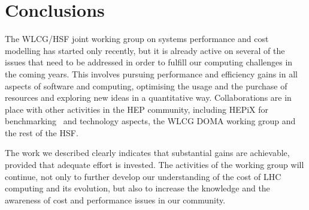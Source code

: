 \section{Conclusions}
The WLCG/HSF joint working group on systems performance and cost
modelling has started only recently, but it is already active on
several of the issues that need to be addressed in order to fulfill
our computing challenges in the coming years. This involves pursuing
performance and efficiency gains in all aspects of software and
computing, optimising the usage and the purchase of resources and
exploring new ideas in a quantitative way. Collaborations are in place
with other activities in the HEP community, including HEPiX for
benchmarking~\cite{hepixbm} and technology aspects, the WLCG DOMA
working group and the rest of the HSF.

The work we described clearly indicates that
substantial gains are achievable, provided that adequate effort is
invested.  The activities of the working group will continue, not only
to further develop our understanding of the cost of LHC computing and
its evolution, but also to increase the knowledge and the awareness of
cost and performance issues in our community.
